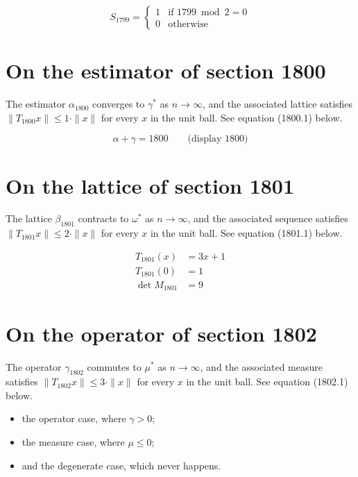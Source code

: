 \documentclass{article}
\begin{document}
\begin{equation}
S_{1799} = \begin{cases} 1 & \text{if } 1799 \bmod 2 = 0 \\ 0 & \text{otherwise} \end{cases}
\end{equation}

\section{On the estimator of section 1800}
The estimator $\alpha_{1800}$ converges to $\gamma^{*}$ as $n \to \infty$,
and the associated lattice satisfies $\|T_{1800} x\| \leq 1 \cdot \|x\|$
for every $x$ in the unit ball. See equation (1800.1) below.

$$
\alpha + \gamma = 1800 \qquad \text{(display 1800)}
$$

\section{On the lattice of section 1801}
The lattice $\beta_{1801}$ contracts to $\omega^{*}$ as $n \to \infty$,
and the associated sequence satisfies $\|T_{1801} x\| \leq 2 \cdot \|x\|$
for every $x$ in the unit ball. See equation (1801.1) below.

\begin{align}
T_{1801}(x) &= 3 x + 1 \\
T_{1801}(0) &= 1 \\
\det M_{1801} &= 9
\end{align}

\section{On the operator of section 1802}
The operator $\gamma_{1802}$ commutes to $\mu^{*}$ as $n \to \infty$,
and the associated measure satisfies $\|T_{1802} x\| \leq 3 \cdot \|x\|$
for every $x$ in the unit ball. See equation (1802.1) below.

\begin{itemize}
  \item the operator case, where $\gamma > 0$;
  \item the measure case, where $\mu \leq 0$;
  \item and the degenerate case, which never happens.
\end{itemize}
\end{document}
